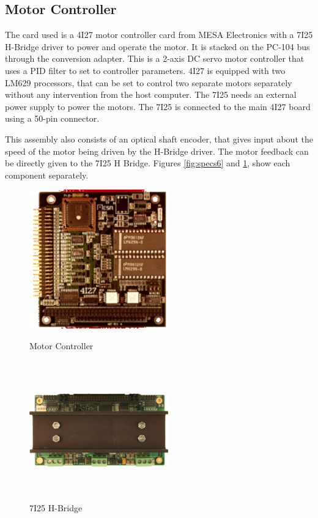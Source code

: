 \subsection{Motor Controller}
The card used is a 4I27 motor controller card from MESA Electronics with a 7I25 H-Bridge driver to power and operate the motor. It is stacked on the PC-104 bus through the conversion adapter. This is a 2-axis DC servo motor controller that uses a PID filter to set to controller parameters. 4I27 is equipped with two LM629 processors, that can be set to control two separate motors separately without any intervention from the host computer.
The 7I25 needs an external power supply to power the motors. The 7I25 is connected to the main 4I27 board using a 50-pin connector. 

This assembly also consists of an optical shaft encoder, that gives input about the speed of the motor being driven by the H-Bridge driver. The motor feedback can be directly given to the 7I25 H Bridge. Figures \ref{fig:specs6} and \ref{fig:specs7}, show each component separately.

\begin{figure}[ht]
\begin{minipage}[b]{0.45\linewidth}
    \centering
    \includegraphics[width=6cm,height=6cm,keepaspectratio]{Pictures/4I27.png}
    \caption{Motor Controller}
    \label{fig:specs6}
\end{minipage}
\begin{minipage}[b]{0.45\linewidth}
    \centering
    \includegraphics[width=6cm,height=6cm,keepaspectratio]{Pictures/7I25.png}
    \caption{7I25 H-Bridge}
    \label{fig:specs7}
\end{minipage}
\end{figure}
